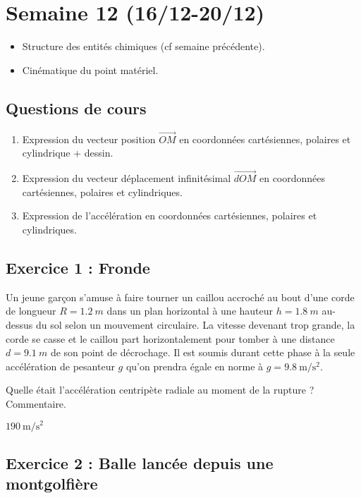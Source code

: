 \section{Semaine 12 (16/12-20/12) }


\begin{itemize}
	\item Structure des entités chimiques (cf semaine précédente).
	\item Cinématique du point matériel.
\end{itemize}

\subsection{Questions de cours}

\begin{enumerate}
	\item Expression du vecteur position $\vec{OM}$ en coordonnées cartésiennes, polaires et cylindrique + dessin.
	\item Expression du vecteur déplacement infinitésimal $\vec{dOM}$ en coordonnées cartésiennes, polaires et cylindriques.
	\item Expression de l'accélération en coordonnées cartésiennes, polaires et cylindriques.
\end{enumerate}

\subsection{Exercice 1 : Fronde}

Un jeune garçon s’amuse à faire tourner un caillou accroché au bout d’une corde de longueur $R = \SI{1.2}{m}$ dans un plan horizontal à une hauteur $h=\SI{1.8}{m}$ au-dessus du sol selon un mouvement circulaire. La vitesse devenant trop grande, la corde se casse et le caillou part horizontalement pour tomber à une distance $d = \SI{9.1}{m}$ de son point de décrochage. Il est soumis durant cette phase à la seule accélération de pesanteur $g$ qu’on prendra égale en norme à $g = \SI{9.8}{\meter\per\second\squared}$. 

Quelle était l’accélération centripète radiale au moment de la rupture ? Commentaire.

 $\SI{190}{\meter\per\second\squared}$

\subsection{Exercice 2 : Balle lancée depuis une montgolfière}

